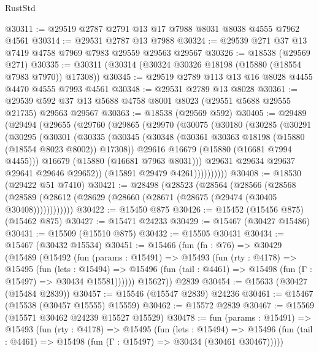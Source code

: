 \begin{lexlean}{RustStd}
\begin{coremodule}
@30311 := @29519 @2787 @2791 @13 @17 @7988 @8031 @8038 @4555 @7962 @4561
@30314 := @29531 @2787 @13 @7988
@30324 := @29539 @271 @37 @13 @7419 @4758 @7969 @7983 @29559 @29563 @29567
@30326 := @18538 (@29569 @271)
@30335 := @30311 (@30314 (@30324 @30326 @18198 (@15880 (@18554 @7983 @7970)) @17308))
@30345 := @29519 @2789 @113 @13 @16 @8028 @4455 @4470 @4555 @7993 @4561
@30348 := @29531 @2789 @13 @8028
@30361 := @29539 @592 @37 @13 @5688 @4758 @8001 @8023 (@29551 @5688 @29555 @21735) @29563 @29567
@30363 := @18538 (@29569 @592)
@30405 := @29489
    (@29494
      (@29655
        (@29760
          (@29865
            (@29970
              (@30075
                (@30180
                  (@30285
                    (@30291
                      (@30295
                        (@30301
                          (@30335
                            (@30345
                              (@30348 (@30361 @30363 @18198 (@15880 (@18554 @8023 @8002)) @17308))
                              @29616
                              @16679
                              (@15880 (@16681 @7994 @4455)))
                            @16679
                            (@15880 (@16681 @7963 @8031)))
                          @29631
                          @29634
                          @29637
                          @29641
                          @29646
                          @29652))
                      (@15891 @29479 @4261))))))))))
@30408 := @18530 (@29422 @51 @7410)
@30421 := @28498
    (@28523
      (@28564
        (@28566
          (@28568 (@28589 (@28612 (@28629 (@28660 (@28671 (@28675 (@29474 (@30405 @30408))))))))))))
@30422 := @15450 @875
@30426 := @15452 (@15456 @875) (@15462 @875)
@30427 := @15471 @24233
@30429 := @15467 (@30427 @15486)
@30431 := @15509 (@15510 @875)
@30432 := @15505 @30431
@30434 := @15467 (@30432 @15534)
@30451 := @15466
    (fun (fn : @76) =>
    @30429
      (@15489
        (@15492
          (fun (params : @15491) =>
          @15493
            (fun (rty : @4178) =>
            @15495
              (fun (lets : @15494) =>
              @15496 (fun (tail : @4461) => @15498 (fun (Γ : @15497) => @30434 @15581))))))
        @15627))
    @2839
@30454 := @15633 (@30427 (@15484 @2839))
@30457 := @15546 (@15547 @2839) @24236
@30461 := @15467 (@15538 (@30457 @15555) @15559)
@30462 := @15572 @2839
@30467 := @15569 (@15571 @30462 @24239 @15527 @15529)
@30478 := fun (params : @15491) =>
  @15493
    (fun (rty : @4178) =>
    @15495
      (fun (lets : @15494) =>
      @15496 (fun (tail : @4461) => @15498 (fun (Γ : @15497) => @30434 (@30461 @30467)))))

\end{coremodule}
\end{lexlean}
